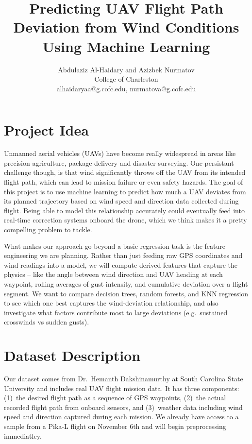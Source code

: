 \documentclass[11pt]{article}
\title{\vspace{-2.5em}\textbf{Predicting UAV Flight Path Deviation from Wind Conditions Using Machine Learning}\vspace{-1em}}
\author{
  Abdulaziz Al-Haidary \quad and \quad Azizbek Nurmatov\\[-1pt]
  \normalsize College of Charleston\\
  \normalsize alhaidaryaa@g.cofc.edu, nurmatova@g.cofc.edu
}
\date{}
\begin{document}
\maketitle
\vspace{-2em}

\section{Project Idea}

Unmanned aerial vehicles (UAVs) have become really widespread in areas like precision agriculture, package delivery and disaster surveying. One persistant challenge though, is that wind significantly throws off the UAV from its intended flight path, which can lead to mission failure or even safety hazards. The goal of this project is to use machine learning to predict how much a UAV deviates from its planned trajectory based on wind speed and direction data collected during flight. Being able to model this relationship accurately could eventually feed into real-time correction systems onboard the drone, which we think makes it a pretty compelling problem to tackle.

What makes our approach go beyond a basic regression task is the feature engineering we are planning. Rather than just feeding raw GPS coordinates and wind readings into a model, we will compute derived features that capture the physics -- like the angle between wind direction and UAV heading at each waypoint, rolling averages of gust intensity, and cumulative deviation over a flight segment. We want to compare decision trees, random forests, and KNN regression to see which one best captures the wind-deviation relationship, and also investigate what factors contribute most to large deviations (e.g.\ sustained crosswinds vs sudden gusts).

\section{Dataset Description}

Our dataset comes from Dr.\ Hemanth Dakshinamurthy at South Carolina State University and includes real UAV flight mission data. It has three components: (1)~the desired flight path as a sequence of GPS waypoints, (2)~the actual recorded flight path from onboard sensors, and (3)~weather data including wind speed and direction captured during each mission. We already have access to a sample from a Pika-L flight on November 6th and will begin preprocessing immediatley.
\end{document}
